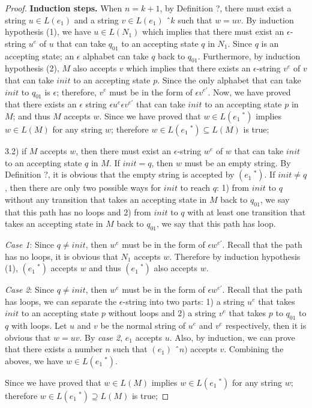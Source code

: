 \begin{proof}
\par \quad \textbf{Induction steps.} \quad When \(n = k + 1\), by
Definition ?, there must exist a string \(u \in L(e_1)\) and a string \(v \in L(e_1)\)
\^\ \(k\) such that \(w=uv\). By induction hypothesis (1), we have \(u
\in L(N_1)\) which implies that there must exist an \(\epsilon\)-string
\(u^e\) of \(u\) that can take \(q_{01}\) to an accepting state \(q\)
in \(N_1\). Since \(q\) is an accepting state; an \(\epsilon\)
alphabet can take \(q\) back to \(q_{01}\). Furthermore, by induction
hypothesis (2), \(M\) also accepts \(v\) which implies that there exists an \(\epsilon\)-string \(v^e\) of \(v\)
that can take \(init\) to an accepting state \(p\). Since the only
alphabet that can take \(init\) to \(q_{01}\) is \(\epsilon\); therefore,
\(v^e\) must be in the form of \(\epsilon v^{e'}\). Now, we have proved
that there exists an \(\epsilon\) string \(\epsilon u^e\epsilon v^{e'}\) that can
take \(init\) to an accepting state \(p\) in \(M\); and thus \(M\)
accepts \(w\). Since we have proved that \(w \in L(e_1\ ^*)\) implies
\(w \in L(M)\) for any string \(w\); therefore \(w \in L(e_1\ ^*)
\subseteq L(M)\) is true; 

\par 3.2) if \(M\) accepts \(w\), then there must exist an
\(\epsilon\)-string \(w^e\) of \(w\) that can take \(init\) to an accepting
state \(q\) in \(M\).  If \(init = q\), then \(w\) must be an empty string. By Definition ?, it is obvious that
the empty string is accepted by \((e_1\ ^*)\). If \(init \neq q\),
then there are only two possible ways for \(init\)
to reach \(q\): 1) from \(init\) to \(q\) without any
transition that takes an accepting state in \(M\) back
to \(q_{01}\), we say that this path has no loops and 2) from \(init\)
to \(q\) with at least one transition that takes an accepting state in \(M\) back
to \(q_{01}\), we say that this path has loop. 
\par \quad \textit{Case 1}: Since \(q \neq init\), then \(w^e\) must
be in the form of \(\epsilon w^{e'}\). Recall that the path has no loops, it is
obvious that \(N_1\) accepts \(w\). Therefore by
induction hypothesis (1), \((e_1\ ^*)\) accepts \(w\) and thus \((e_1\
^*)\) also accepts \(w\). 
\par \quad \textit{Case 2}: Since \(q \neq init\), then \(w^e\) must
be in the form of \(\epsilon w^{e'}\). Recall that the path has loops, we
can separate the \(\epsilon\)-string into two parts: 1) a string
\(u^e\) that takes \(init\) to an accepting state \(p\) without loops
and 2) a string \(v^e\) that takes \(p\) to
\(q_{01}\) to \(q\) with loops. Let \(u\) and \(v\) be the normal
string of \(u^e\) and \(v^e\) respectively, then it is obvious that
\(w = uv\). By \textit{case 2}, \(e_1\) accepts \(u\). Also, by
induction, we can prove that there exists a number \(n\) such that
\((e_1)\) \^\ \(n)\) accepts \(v\). Combining the aboves, we have \(w \in
L(e_1\ ^*)\). 
\par Since we have proved that \(w \in L(M)\) implies \(w \in L(e_1\ ^*)\) for any string \(w\); therefore \(w \in
L(e_1\ ^*) \supseteq L(M)\) is true; 


\end{proof}
